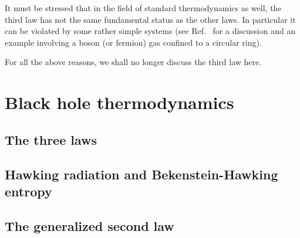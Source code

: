 It must be stressed that in the field of standard thermodynamics as well, the third law has not the same fundamental status as the other laws.
In particular it can be violated by some rather simple systems (see Ref.~\cite{Wald97} for a discussion and an example involving a boson (or fermion) gas confined to a circular ring).

For all the above reasons, we shall no longer discuss the third law here.


\section{Black hole thermodynamics}

\subsection{The three laws}

\subsection{Hawking radiation and Bekenstein-Hawking entropy}

\subsection{The generalized second law}

